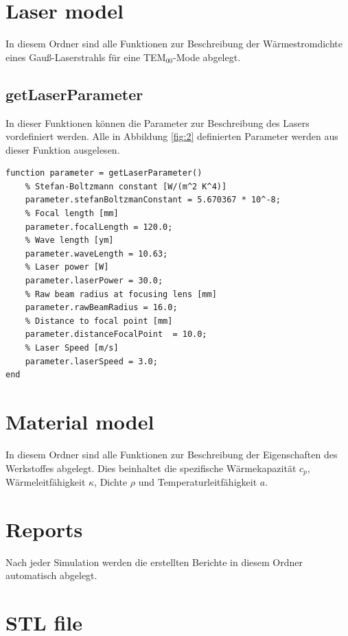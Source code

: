 \documentclass{scrartcl}
\begin{document}
\section{Laser model}\label{sec:laserModel}

In diesem Ordner sind alle Funktionen zur Beschreibung der Wärmestromdichte eines Gauß-Laserstrahls für eine TEM$_{00}$-Mode abgelegt.

\subsection{getLaserParameter}\label{subsec:getLaserParameter}

In dieser Funktionen können die Parameter zur Beschreibung des Lasers vordefiniert werden. Alle in Abbildung \ref{fig:2} definierten Parameter werden aus dieser Funktion ausgelesen. 

\begin{lstlisting}
function parameter = getLaserParameter()
    % Stefan-Boltzmann constant [W/(m^2 K^4)]
    parameter.stefanBoltzmanConstant = 5.670367 * 10^-8;
    % Focal length [mm]
    parameter.focalLength = 120.0;
    % Wave length [ym]
    parameter.waveLength = 10.63;
    % Laser power [W]
    parameter.laserPower = 30.0;
    % Raw beam radius at focusing lens [mm] 
    parameter.rawBeamRadius = 16.0;
    % Distance to focal point [mm]
    parameter.distanceFocalPoint  = 10.0;
    % Laser Speed [m/s]
    parameter.laserSpeed = 3.0;
end
\end{lstlisting}

\section{Material model}\label{sec:materialModel}

In diesem Ordner sind alle Funktionen zur Beschreibung der Eigenschaften des Werkstoffes abgelegt. Dies beinhaltet die spezifische Wärmekapazität $ c_{p} $, Wärmeleitfähigkeit $ \kappa $, Dichte $ \rho $ und Temperaturleitfähigkeit $ a $.

\section{Reports}\label{sec:reports}

Nach jeder Simulation werden die erstellten Berichte in diesem Ordner automatisch abgelegt.

\section{STL file}\label{sec:stlFile}
\end{document}

